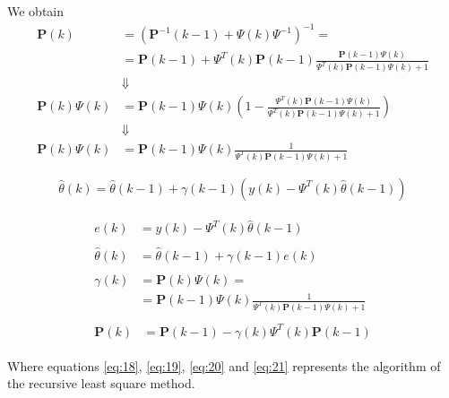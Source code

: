 \documentclass[12pt,a4paper,oneside]{book}
\begin{document}
\begin{onehalfspace}
We obtain
\begin{equation*}
	\begin{aligned}
		\mathbf{P}(k) &= 
		\left(\mathbf{P}^{-1}(k-1)+\Psi(k)\Psi^{-1}\right)^{-1} = \\[6pt]
		&= \mathbf{P}(k-1) +\Psi^T(k)\mathbf{P}(k-1) \frac{\mathbf{P} 
		(k-1)\Psi(k)}{\Psi^T(k)\mathbf{P}(k-1)\Psi(k)+1} \\[6pt]
		& \Downarrow \\[6pt]
		\mathbf{P}(k)\Psi(k) &= \mathbf{P}(k-1)\Psi(k)\left(1- 
		\frac{\Psi^T(k)\mathbf{P}(k-1)\Psi(k)}{\Psi^T(k)\mathbf{P}(k-1)\Psi(k)+1}\right)
		 \\[6pt]
		& \Downarrow \\[6pt]
		\mathbf{P}(k)\Psi(k) &= \mathbf{P}(k-1) \Psi(k)\frac{1}{\Psi^T(k) 
		\mathbf{P}(k-1)\Psi(k)+1}
	\end{aligned}
\end{equation*} 

\begin{equation*}
	\hat{\theta}(k)=\hat{\theta}(k-1)+\gamma(k-1)\left(y(k)-\Psi^T(k)\hat{\theta}(k-1)
	 \right)
\end{equation*}

\begin{mybox}
	\begin{align}
		\begin{split}\label{eq:18}
			e(k)&=y(k)-\Psi^T(k)\hat{\theta}(k-1)
		\end{split} \\[6pt]
		\begin{split}\label{eq:19}
			\hat{\theta}(k) &= \hat{\theta}(k-1)+\gamma(k-1)e(k)
		\end{split} \\[6pt]
		\begin{split}\label{eq:20}
			\gamma(k) &= \mathbf{P}(k)\Psi(k) = \\[6pt]
			&= \mathbf{P}(k-1)\Psi(k)\frac{1}{\Psi^T(k)\mathbf{P}(k-1)\Psi(k)+1}
		\end{split} \\[6pt]
		\begin{split}\label{eq:21}
			\mathbf{P}(k) &= \mathbf{P}(k-1)-\gamma(k)\Psi^T(k)\mathbf{P}(k-1)
		\end{split} 
	\end{align} 
\end{mybox}
Where equations \eqref{eq:18}, \eqref{eq:19}, \eqref{eq:20} and \eqref{eq:21} 
represents the algorithm of the recursive least square method.
\vspace{10mm}


\end{onehalfspace}
\end{document}
